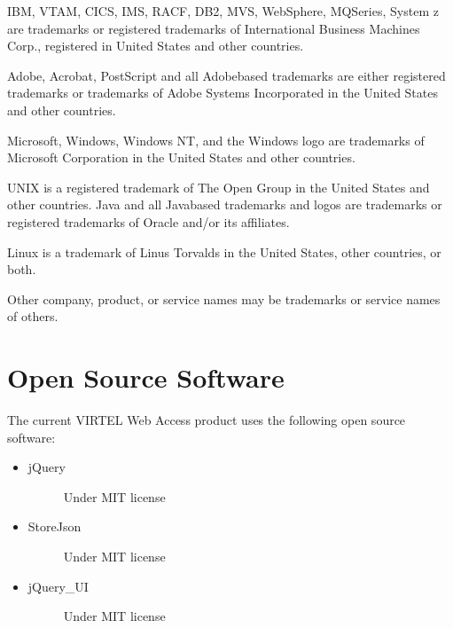 \documentclass[letterpaper,10pt,english]{sphinxmanual}
\begin{document}
IBM, VTAM, CICS, IMS, RACF, DB2, MVS, WebSphere, MQSeries, System z are trademarks or registered trademarks of
International Business Machines Corp., registered in United States and other countries.

Adobe, Acrobat, PostScript and all Adobe\sphinxhyphen{}based trademarks are either registered trademarks or trademarks of Adobe
Systems Incorporated in the United States and other countries.

Microsoft, Windows, Windows NT, and the Windows logo are trademarks of Microsoft Corporation in the United States
and other countries.

UNIX is a registered trademark of The Open Group in the United States and other countries.
Java and all Java\sphinxhyphen{}based trademarks and logos are trademarks or registered trademarks of Oracle and/or its affiliates.

Linux is a trademark of Linus Torvalds in the United States, other countries, or both.

Other company, product, or service names may be trademarks or service names of others.


\section{Open Source Software}
\label{\detokenize{Getting_Started:open-source-software}}
The current VIRTEL Web Access product uses the following open source software:
\begin{itemize}
\item {} \begin{description}
\item[{jQuery}] \leavevmode
Under MIT license \sphinxhyphen{} 

\end{description}

\item {} \begin{description}
\item[{StoreJson}] \leavevmode
Under MIT license \sphinxhyphen{} 

\end{description}

\item {} \begin{description}
\item[{jQuery\_UI}] \leavevmode
Under MIT license \sphinxhyphen{} 

\end{description}

\end{itemize}



\renewcommand{\indexname}{Index}
\printindex
\end{document}
